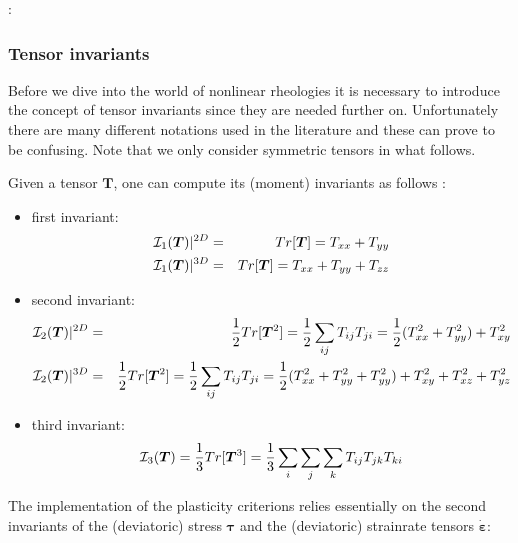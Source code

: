 
\Literature: \cite{mumc03,chpe15,momu06,muso11}

\subsubsection{Tensor invariants}\label{sec:invariants}

Before we dive into the world of nonlinear rheologies it is necessary to introduce the concept of tensor 
invariants since they are needed further on. 
Unfortunately there are many different notations used in the literature and these can prove to be 
confusing. Note that we only consider symmetric tensors in what follows.

Given a tensor $\bm{T}$,  one can compute its (moment) invariants as follows \cite[p.339]{reddybook2}: 
\begin{itemize}
\item first invariant:
\begin{eqnarray}
{\cal I}_1({\bm T})|^{2D} &=& Tr[\bm{T}] = T_{xx} + T_{yy} \nonumber\\
{\cal I}_1({\bm T})|^{3D} &=& Tr[\bm{T}] = T_{xx} + T_{yy} + T_{zz} 
\end{eqnarray}
\item second invariant:
\begin{eqnarray}
{\cal I}_2({\bm T})|^{2D} &=& \frac{1}{2} Tr[{\bm{T}^2}] = \frac{1}{2} \sum_{ij} T_{ij} T_{ji} = \frac{1}{2} (T_{xx}^2 + T_{yy}^2) + T_{xy}^2 \nonumber\\
{\cal I}_2({\bm T})|^{3D} &=& \frac{1}{2} Tr[{\bm{T}^2}] = \frac{1}{2} \sum_{ij} T_{ij} T_{ji} = \frac{1}{2} (T_{xx}^2 + T_{yy}^2 + T_{yy}^2) + T_{xy}^2 + T_{xz}^2 + T_{yz}^2 
\end{eqnarray}
\item third invariant: 
\begin{equation}
{\cal I}_3({\bm T}) = \frac{1}{3} Tr[{\bm{T}^3}]  = \frac{1}{3}\sum_i\sum_j \sum_k T_{ij} T_{jk} T_{ki} 
\end{equation}
\end{itemize}


The implementation of the plasticity criterions relies essentially 
on the second invariants of the (deviatoric) stress ${\bm \tau}$ and the (deviatoric) strainrate tensors $\dot{\bm \varepsilon}$:

